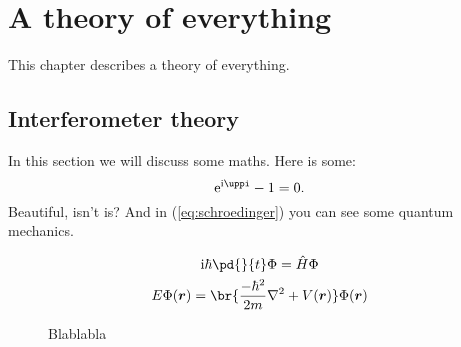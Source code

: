 \cleardoublepage
\chapter{A theory of everything}\label{ch:theory}
This chapter describes a theory of everything.
\section{Interferometer theory}\label{s:inttheory}
In this section we will discuss some maths. Here is some:
\begin{equation}
   \e^{\i\pi} - 1 = 0\text{.}
\end{equation}
Beautiful, isn't is? And in (\ref{eq:schroedinger}) you can see some quantum mechanics.

\begin{subequations}\label{eq:schroedinger}
   \begin{gather}
      \i \hbar \pd{}{t}\Phi = \op{H}\Phi\\
      E\Phi(\vec{r}) = \br{\frac{-\hbar^2}{2m} \nabla^2 + V(\vec{r}) } \Phi(\vec{r})
   \end{gather}
\end{subequations}

\begin{figure}[htb]
\centering
   \setlength{}
   \setlength{}
   {\small
   
   }
 \caption[Rabi oscillation of ]{Blablabla}
 \label{fig:rabi}
\end{figure}

